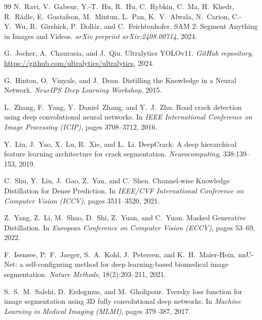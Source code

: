 \documentclass[11pt,a4paper]{article}
\begin{document}
\begin{thebibliography}{99}
N.~Ravi, V.~Gabeur, Y.-T.~Hu, R.~Hu, C.~Rybkin, C.~Ma, H.~Khedr, R.~R\"{a}dle, E.~Gustafson, M.~Mintun, L.~Pan, K.~V.~Alwala, N.~Carion, C.-Y.~Wu, R.~Girshick, P.~Doll\'{a}r, and C.~Feichtenhofer.
\newblock SAM 2: Segment Anything in Images and Videos.
\newblock \emph{arXiv preprint arXiv:2408.00714}, 2024.

G.~Jocher, A.~Chaurasia, and J.~Qiu.
\newblock Ultralytics YOLOv11.
\newblock \emph{GitHub repository}, \url{https://github.com/ultralytics/ultralytics}, 2024.

G.~Hinton, O.~Vinyals, and J.~Dean.
\newblock Distilling the Knowledge in a Neural Network.
\newblock \emph{NeurIPS Deep Learning Workshop}, 2015.

L.~Zhang, F.~Yang, Y.~Daniel~Zhang, and Y.~J.~Zhu.
\newblock Road crack detection using deep convolutional neural networks.
\newblock In \emph{IEEE International Conference on Image Processing (ICIP)}, pages 3708--3712, 2016.

Y.~Liu, J.~Yao, X.~Lu, R.~Xie, and L.~Li.
\newblock DeepCrack: A deep hierarchical feature learning architecture for crack segmentation.
\newblock \emph{Neurocomputing}, 338:139--153, 2019.

C.~Shu, Y.~Liu, J.~Gao, Z.~Yan, and C.~Shen.
\newblock Channel-wise Knowledge Distillation for Dense Prediction.
\newblock In \emph{IEEE/CVF International Conference on Computer Vision (ICCV)}, pages 3511--3520, 2021.

Z.~Yang, Z.~Li, M.~Shao, D.~Shi, Z.~Yuan, and C.~Yuan.
\newblock Masked Generative Distillation.
\newblock In \emph{European Conference on Computer Vision (ECCV)}, pages 53--69, 2022.

F.~Isensee, P.~F.~Jaeger, S.~A.~Kohl, J.~Petersen, and K.~H.~Maier-Hein.
\newblock nnU-Net: a self-configuring method for deep learning-based biomedical image segmentation.
\newblock \emph{Nature Methods}, 18(2):203--211, 2021.

S.~S.~M.~Salehi, D.~Erdogmus, and M.~Gholipour.
\newblock Tversky loss function for image segmentation using 3D fully convolutional deep networks.
\newblock In \emph{Machine Learning in Medical Imaging (MLMI)}, pages 379--387, 2017.


\end{thebibliography}
\end{document}
